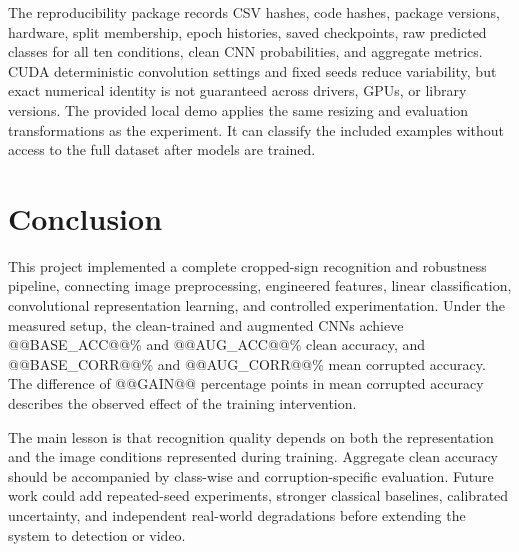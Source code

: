 \documentclass[conference]{IEEEtran}
\begin{document}
The reproducibility package records CSV hashes, code hashes, package versions, hardware, split membership, epoch histories, saved checkpoints, raw predicted classes for all ten conditions, clean CNN probabilities, and aggregate metrics. CUDA deterministic convolution settings and fixed seeds reduce variability, but exact numerical identity is not guaranteed across drivers, GPUs, or library versions. The provided local demo applies the same resizing and evaluation transformations as the experiment. It can classify the included examples without access to the full dataset after models are trained.

\balance
\section{Conclusion}
This project implemented a complete cropped-sign recognition and robustness pipeline, connecting image preprocessing, engineered features, linear classification, convolutional representation learning, and controlled experimentation. Under the measured setup, the clean-trained and augmented CNNs achieve @@BASE_ACC@@\% and @@AUG_ACC@@\% clean accuracy, and @@BASE_CORR@@\% and @@AUG_CORR@@\% mean corrupted accuracy. The difference of @@GAIN@@ percentage points in mean corrupted accuracy describes the observed effect of the training intervention.

The main lesson is that recognition quality depends on both the representation and the image conditions represented during training. Aggregate clean accuracy should be accompanied by class-wise and corruption-specific evaluation. Future work could add repeated-seed experiments, stronger classical baselines, calibrated uncertainty, and independent real-world degradations before extending the system to detection or video.
\end{document}
